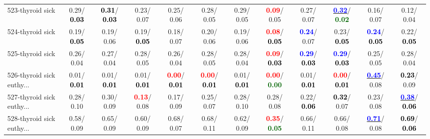\begin{table}[h]
\begin{center}
{\begin{tabular}{lc|c|c|c|c|c|c|c|c|c|c}
523-thyroid sick &   0.29/\textcolor{black}{\textbf{  0.03}} & \textcolor{black}{\textbf{  0.31}}/\textcolor{black}{\textbf{  0.03}} &   0.23/  0.07 &   0.25/  0.06 &   0.28/  0.05 &   0.29/  0.05 & \textcolor{red}{\textbf{  0.09}}/  0.05 &   0.27/  0.07 & \underline{\textcolor{blue}{\textbf{  0.32}}}/\textcolor{darkgreen}{\textbf{  0.02}} &   0.16/  0.07 &   0.12/  0.04 \\
524-thyroid sick &   0.19/\textcolor{black}{\textbf{  0.05}} &   0.19/  0.06 &   0.19/\textcolor{black}{\textbf{  0.05}} &   0.18/  0.07 &   0.20/  0.06 &   0.19/  0.06 & \textcolor{red}{\textbf{  0.08}}/\textcolor{black}{\textbf{  0.05}} & \textcolor{blue}{\textbf{  0.24}}/  0.07 &   0.23/\textcolor{black}{\textbf{  0.05}} & \textcolor{blue}{\textbf{  0.24}}/\textcolor{black}{\textbf{  0.05}} &   0.22/\textcolor{black}{\textbf{  0.05}} \\
525-thyroid sick &   0.26/  0.04 &   0.27/  0.04 &   0.28/  0.05 &   0.26/  0.04 &   0.28/  0.05 &   0.28/  0.04 & \textcolor{red}{\textbf{  0.09}}/\textcolor{black}{\textbf{  0.03}} & \textcolor{blue}{\textbf{  0.29}}/\textcolor{black}{\textbf{  0.03}} & \textcolor{blue}{\textbf{  0.29}}/\textcolor{black}{\textbf{  0.03}} &   0.25/  0.05 &   0.28/  0.04 \\
526-thyroid sick euthy... &   0.01/\textcolor{black}{\textbf{  0.01}} &   0.01/\textcolor{black}{\textbf{  0.01}} &   0.01/\textcolor{black}{\textbf{  0.01}} & \textcolor{red}{\textbf{  0.00}}/\textcolor{black}{\textbf{  0.01}} & \textcolor{red}{\textbf{  0.00}}/\textcolor{black}{\textbf{  0.01}} &   0.01/\textcolor{black}{\textbf{  0.01}} & \textcolor{red}{\textbf{  0.00}}/\textcolor{darkgreen}{\textbf{  0.00}} &   0.01/\textcolor{black}{\textbf{  0.01}} & \textcolor{red}{\textbf{  0.00}}/\textcolor{black}{\textbf{  0.01}} & \underline{\textcolor{blue}{\textbf{  0.45}}}/  0.08 & \textcolor{black}{\textbf{  0.23}}/  0.09 \\ \hline
527-thyroid sick euthy... &   0.28/  0.10 &   0.30/  0.09 & \textcolor{red}{\textbf{  0.13}}/  0.08 &   0.17/  0.09 &   0.25/  0.07 &   0.28/  0.10 &   0.28/  0.08 &   0.22/\textcolor{black}{\textbf{  0.06}} & \textcolor{black}{\textbf{  0.32}}/  0.07 &   0.23/  0.08 & \underline{\textcolor{blue}{\textbf{  0.38}}}/\textcolor{black}{\textbf{  0.06}} \\
528-thyroid sick euthy... &   0.58/  0.09 &   0.65/  0.09 &   0.60/  0.09 &   0.68/  0.07 &   0.68/  0.11 &   0.62/  0.09 & \textcolor{red}{\textbf{  0.35}}/\textcolor{darkgreen}{\textbf{  0.05}} &   0.66/  0.11 &   0.66/  0.08 & \underline{\textcolor{blue}{\textbf{  0.71}}}/  0.08 & \textcolor{black}{\textbf{  0.69}}/\textcolor{black}{\textbf{  0.06}} \\

\end{tabular}}
\end{center}
\end{table}
